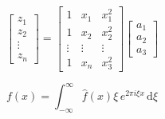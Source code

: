 \documentclass{imutthesis}
\begin{document}
\begin{equation} 
	\begin{bmatrix}
		z_{1}\\
		z_{2}\\
		\vdots\\
		z_{n}
	\end{bmatrix}
	=\begin{bmatrix}
		1 & x_{1}  &x_{1}^{2}  \\
		1& x_{2} & x_{2}^{2} \\
		\vdots & \vdots & \vdots\\
		1 & x_{n} & x_{3}^{2}
	\end{bmatrix}
	\begin{bmatrix}
		a_{1} \\
		a_{2} \\
		a_{3} 
	\end{bmatrix}
\end{equation}

\begin{equation}
f(x) = \int_{-\infty}^\infty  \hat f(x)\xi\,e^{2 \pi i \xi x}  \,\mathrm{d}\xi 
\end{equation}
\begin{acknowledgment}

\end{acknowledgment}
\end{document}
